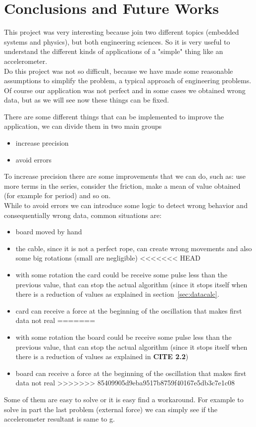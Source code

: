 \section{Conclusions and Future Works}
\label{sec:conclusions}
This project was very interesting because join two different topics (embedded systems and physics), but both engineering sciences. So it is very useful to understand the different kinds of applications of a "simple" thing like an accelerometer.\\
Do this project was not so difficult, because we have made some reasonable assumptions to simplify the problem, a typical approach of engineering problems. Of course our application was not perfect and in some cases we obtained wrong data, but as we will see now these things can be fixed.\par
There are some different things that can be implemented to improve the application, we can divide them in two main groups
\begin{itemize}
	\item increase precision
	\item avoid errors
\end{itemize}
To increase precision there are some improvements that we can do, such as: use more terms in the series, consider the friction, make a mean of value obtained (for example for period) and so on.\\
While to avoid errors we can introduce some logic to detect wrong behavior and consequentially wrong data, common situations are:
\begin{itemize}
	\item board moved by hand
	\item the cable, since it is not a perfect rope, can create wrong movements and also some big rotations (small are negligible)
<<<<<<< HEAD
	\item with some rotation the card could be receive some pulse less than the previous value, that can stop the actual algorithm (since it stops itself when there is a reduction of values as explained in section~\ref{sec:datacalc}.
	\item card can receive a force at the beginning of the oscillation that makes first data not real
=======
	\item with some rotation the board could be receive some pulse less than the previous value, that can stop the actual algorithm (since it stops itself when there is a reduction of values as explained in  \textbf{CITE 2.2})
	\item board can receive a force at the beginning of the oscillation that makes first data not real
>>>>>>> 85409905d9eba9517b8759f40167e5db3c7e1c08
\end{itemize}
Some of them are easy to solve or it is easy find a workaround. For example to solve in part the last problem (external force) we can simply see if the accelerometer resultant is same to g.

